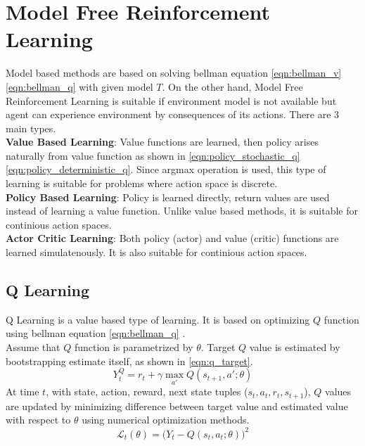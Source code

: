\section{Model Free Reinforcement Learning}
\label{sec:mf_rl}
Model based methods are based on solving bellman equation \ref{eqn:bellman_v}\ref{eqn:bellman_q} with given model $T$. On the other hand, Model Free Reinforcement Learning is suitable if environment model is not available but agent can experience environment by consequences of its actions. There are 3 main types. \\
\textbf{Value Based Learning}: Value functions are learned, then policy arises naturally from value function as shown in \eqref{eqn:policy_stochastic_q} \eqref{eqn:policy_deterministic_q}. Since argmax operation is used, this type of learning is suitable for problems where action space is discrete. \\
\textbf{Policy Based Learning}: Policy is learned directly, return values are used instead of learning a value function. Unlike value based methods, it is suitable for continious action spaces. \\
\textbf{Actor Critic Learning}: Both policy (actor) and value (critic) functions are learned simulatenously. It is also suitable for continious action spaces. \\
\subsection{Q Learning}
Q Learning is a value based type of learning. It is based on optimizing $Q$ function using bellman equation \eqref{eqn:bellman_q} \cite{watkins_technical_1992}. \\ 
Assume that $Q$ function is parametrized by $\theta$. Target $Q$ value is estimated by bootstrapping estimate itself, as shown in  \eqref{eqn:q_target}. \\
%
\begin{equation}
\label{eqn:q_target}
Y_t^Q = r_t + \gamma \max_{a'} Q(s_{t+1},a';\theta)
\end{equation}
At time $t$,  with state, action, reward, next state tuples ($s_t,a_t,r_t,s_{t+1}$), $Q$ values are updated by minimizing difference between target value and estimated value with respect to $\theta$ using numerical optimization methods. \\
\begin{equation}
\label{eqn:q_loss}
\mathcal{L}_t(\theta) = \big( Y_t - Q(s_t,a_t;\theta) \big) ^ 2
\end{equation}
%
